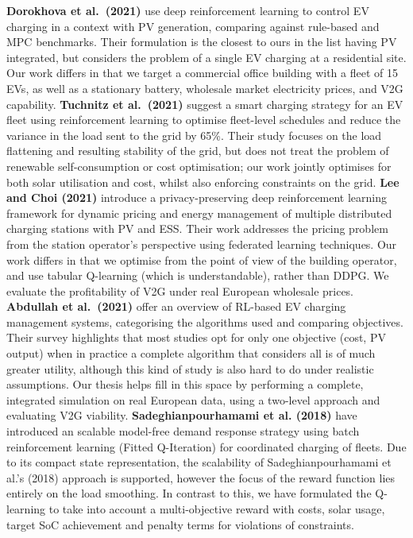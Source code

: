 \textbf{Dorokhova et al.\ (2021)} \cite{dorokhova2021drl_ev_pv} use deep reinforcement learning to control EV charging in a context with PV generation, comparing against rule-based and MPC benchmarks. Their formulation is the closest to ours in the list having PV integrated, but considers the problem of a single EV charging at a residential site. Our work differs in that we target a commercial office building with a fleet of 15 EVs, as well as a stationary battery, wholesale market electricity prices, and V2G capability.
\textbf{Tuchnitz et al.\ (2021)} \cite{tuchnitz2021smart_ev_fleet} suggest a smart charging strategy for an EV fleet using reinforcement learning to optimise fleet-level schedules and reduce the variance in the load sent to the grid by 65\%. Their study focuses on the load flattening and resulting stability of the grid, but does not treat the problem of renewable self-consumption or cost optimisation; our work jointly optimises for both solar utilisation and cost, whilst also enforcing constraints on the grid.
\textbf{Lee and Choi (2021)} \cite{lee2021dynamic_pricing_ev} introduce a privacy-preserving deep reinforcement learning framework for dynamic pricing and energy management of multiple distributed charging stations with PV and ESS. Their work addresses the pricing problem from the station operator's perspective using federated learning techniques. Our work differs in that we optimise from the point of view of the building operator, and use tabular Q-learning (which is understandable), rather than DDPG. We evaluate the profitability of V2G under real European wholesale prices.
\textbf{Abdullah et al.\ (2021)} \cite{abdullah2021rl_ev_review} offer an overview of RL-based EV charging management systems, categorising the algorithms used and comparing objectives. Their survey highlights that most studies opt for only one objective (cost, PV output) when in practice a complete algorithm that considers all is of much greater utility, although this kind of study is also hard to do under realistic assumptions. Our thesis helps fill in this space by performing a complete, integrated simulation on real European data, using a two-level approach and evaluating V2G viability.
\textbf{Sadeghianpourhamami et al. (2018)} \cite{sadeghianpourhamami2018scalable_ev} have introduced an scalable model-free demand response strategy using batch reinforcement learning (Fitted Q-Iteration) for coordinated charging of fleets. Due to its compact state representation, the scalability of Sadeghianpourhamami et al.'s (2018) approach is supported, however the focus of the reward function lies entirely on the load smoothing. In contrast to this, we have formulated the Q-learning to take into account a multi-objective reward with costs, solar usage, target SoC achievement and penalty terms for violations of constraints.

